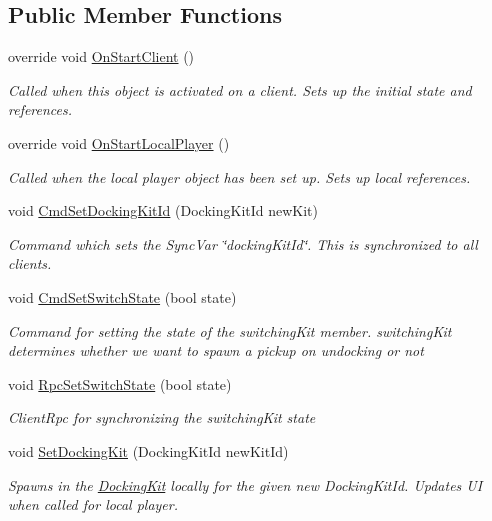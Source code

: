 \subsection*{Public Member Functions}
\begin{DoxyCompactItemize}
\item 
override void \hyperlink{class_docking_aa14ecfa7a3221dd327d0a4aa32ecdf38}{On\+Start\+Client} ()
\begin{DoxyCompactList}\small\item\em Called when this object is activated on a client. Sets up the initial state and references. \end{DoxyCompactList}\item 
override void \hyperlink{class_docking_a056ea40ea6f2afb8ba492970f042fc17}{On\+Start\+Local\+Player} ()
\begin{DoxyCompactList}\small\item\em Called when the local player object has been set up. Sets up local references. \end{DoxyCompactList}\item 
void \hyperlink{class_docking_a44a8510bc605c3195df5e30e4ef9df10}{Cmd\+Set\+Docking\+Kit\+Id} (Docking\+Kit\+Id new\+Kit)
\begin{DoxyCompactList}\small\item\em Command which sets the Sync\+Var \char`\"{}docking\+Kit\+Id\char`\"{}. This is synchronized to all clients. \end{DoxyCompactList}\item 
void \hyperlink{class_docking_adbe205bfd5f26e74b6d746669d15a117}{Cmd\+Set\+Switch\+State} (bool state)
\begin{DoxyCompactList}\small\item\em Command for setting the state of the switching\+Kit member. switching\+Kit determines whether we want to spawn a pickup on undocking or not \end{DoxyCompactList}\item 
void \hyperlink{class_docking_a70fe421a545e05d6c696f7ea3f371156}{Rpc\+Set\+Switch\+State} (bool state)
\begin{DoxyCompactList}\small\item\em Client\+Rpc for synchronizing the switching\+Kit state \end{DoxyCompactList}\item 
void \hyperlink{class_docking_ace7395b879afe6788c7095fdf6c404a1}{Set\+Docking\+Kit} (Docking\+Kit\+Id new\+Kit\+Id)
\begin{DoxyCompactList}\small\item\em Spawns in the \hyperlink{class_docking_kit}{Docking\+Kit} locally for the given new Docking\+Kit\+Id. Updates UI when called for local player. \end{DoxyCompactList}\item 

\end{DoxyCompactItemize}

